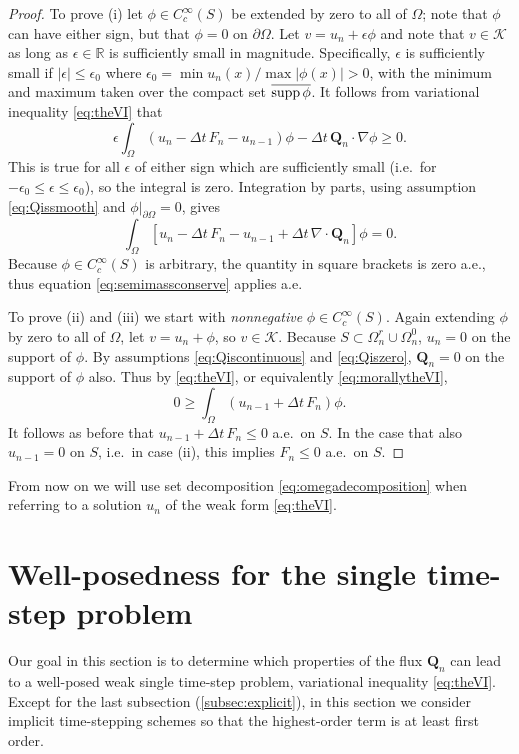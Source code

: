 \documentclass[final,leqno,onefignum,onetabnum]{siamltex1213bueler}
\newcommand\bQ{\mathbf{Q}}
\newcommand{\Div}{\nabla\cdot}
\newcommand\eps{\epsilon}
\renewcommand{\grad}{\nabla}
\newcommand\RR{\mathbb{R}}
\begin{document}
\medskip
\begin{proof}  To prove (i) let $\phi\in C_c^\infty(S)$ be extended by zero to all of $\Omega$; note that $\phi$ can have either sign, but that $\phi=0$ on $\partial\Omega$.  Let $v = u_n + \eps \phi$ and note that $v \in \mathcal{K}$ as long as $\eps\in\RR$ is sufficiently small in magnitude.  Specifically, $\eps$ is sufficiently small if $|\eps|\le \eps_0$ where $\eps_0 = \min u_n(x) / \max |\phi(x)| > 0$, with the minimum and maximum taken over the compact set $\overline{\supp \phi}$.  It follows from variational inequality \eqref{eq:theVI} that
   $$\eps \int_\Omega \left(u_n - \Delta t\,F_n - u_{n-1}\right)\phi - \Delta t\,\bQ_n \cdot \grad \phi \ge 0.$$
This is true for all $\eps$ of either sign which are sufficiently small (i.e.~for $-\eps_0 \le \eps \le \eps_0$), so the integral is zero.  Integration by parts, using assumption \eqref{eq:Qissmooth} and $\phi\big|_{\partial\Omega}=0$, gives
   $$\int_\Omega \left[ u_n - \Delta t\,F_n - u_{n-1} + \Delta t\,\Div\bQ_n \right]\phi = 0.$$
Because $\phi\in C_c^\infty(S)$ is arbitrary, the quantity in square brackets is zero a.e., thus equation \eqref{eq:semimassconserve} applies a.e.

To prove (ii) and (iii) we start with \emph{nonnegative} $\phi\in C_c^\infty(S)$.  Again extending $\phi$ by zero to all of $\Omega$, let $v = u_n + \phi$, so $v\in\mathcal{K}$.  Because $S\subset \Omega_n^r\cup\Omega_n^0$, $u_n=0$ on the support of $\phi$.  By assumptions \eqref{eq:Qiscontinuous} and \eqref{eq:Qiszero}, $\bQ_n=0$ on the support of $\phi$ also.  Thus by \eqref{eq:theVI}, or equivalently \eqref{eq:morallytheVI},
    $$0 \ge \int_{\Omega} \left(u_{n-1} + \Delta t\, F_n\right) \phi.$$
It follows as before that $u_{n-1} + \Delta t\, F_n \le 0$ a.e.~on $S$.  In the case that also $u_{n-1}=0$ on $S$, i.e.~in case (ii), this implies $F_n \le 0$ a.e.~on $S$.\end{proof}

\medskip
From now on we will use set decomposition \eqref{eq:omegadecomposition} when referring to a solution $u_n$ of the weak form \eqref{eq:theVI}.


\section{Well-posedness for the single time-step problem} \label{sec:wellposed}  Our goal in this section is to determine which properties of the flux $\bQ_n$ can lead to a well-posed weak single time-step problem, variational inequality \eqref{eq:theVI}.  Except for the last subsection (\ref{subsec:explicit}), in this section we consider implicit time-stepping schemes so that the highest-order term is at least first order.
\end{document}
